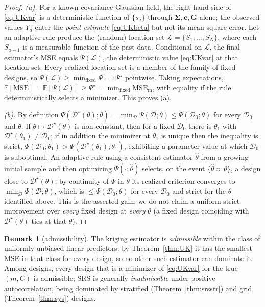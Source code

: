 \documentclass{amsart}
\theoremstyle{definition}
\newtheorem{remark}[theorem]{Remark}
\newcommand{\E}{\mathbb{E}}
\begin{document}
\begin{proof}
\emph{(a).} For a known-covariance Gaussian field, the right-hand side of
\eqref{eq:UKvar} is a deterministic function of $\{s_a\}$ through
$\boldsymbol\Sigma,\mathbf c,\mathbf G$ alone; the observed values $Y_a$
enter the \emph{point estimate} \eqref{eq:UKbeta} but not its
mean-square error. Let an adaptive rule produce the (random) location set
$\mathcal L=\{S_1,\dots,S_N\}$, where each $S_{a+1}$ is a measurable
function of the past data. Conditional on $\mathcal L$, the final
estimator's MSE equals $\Psi(\mathcal L)$, the deterministic value
\eqref{eq:UKvar} at that location set. Every realized location set is a
member of the family of fixed designs, so
$\Psi(\mathcal L)\ge\min_{\text{fixed}}\Psi=:\Psi^\star$ pointwise.
Taking expectations,
$\E[\mathrm{MSE}]=\E[\Psi(\mathcal L)]\ge\Psi^\star
=\min_{\text{fixed}}\mathrm{MSE}_{\mathrm m}$, with equality if the rule
deterministically selects a minimizer. This proves (a).

\emph{(b).} By definition $\Psi(\mathcal D^\star(\theta);\theta)
=\min_{\mathcal D}\Psi(\mathcal D;\theta)\le\Psi(\mathcal D_0;\theta)$ for
every $\mathcal D_0$ and $\theta$. If $\theta\mapsto\mathcal D^\star(\theta)$
is non-constant, then for a fixed $\mathcal D_0$ there is $\theta_1$ with
$\mathcal D^\star(\theta_1)\ne\mathcal D_0$; if in addition the minimizer at
$\theta_1$ is unique then the inequality is strict,
$\Psi(\mathcal D_0;\theta_1)>\Psi(\mathcal D^\star(\theta_1);\theta_1)$,
exhibiting a parameter value at which $\mathcal D_0$ is suboptimal. An
adaptive rule using a consistent estimator $\widehat\theta$ from a growing
initial sample and then optimizing $\Psi(\cdot;\widehat\theta)$ selects, on
the event $\{\widehat\theta\approx\theta\}$, a design close to
$\mathcal D^\star(\theta)$; by continuity of $\Psi$ in $\theta$ its
realized criterion converges to $\min_{\mathcal D}\Psi(\mathcal D;\theta)$,
which is $\le\Psi(\mathcal D_0;\theta)$ for every $\mathcal D_0$ and strict
for the $\theta$ identified above. This is the asserted gain; we do not
claim a uniform strict improvement over \emph{every} fixed design at
\emph{every} $\theta$ (a fixed design coinciding with
$\mathcal D^\star(\theta)$ ties at that $\theta$).
\end{proof}

\begin{remark}[admissibility]
The kriging estimator is \emph{admissible} within the class of uniformly
unbiased linear predictors: by Theorem~\ref{thm:UK} it has the smallest MSE
in that class for every design, so no other such estimator can dominate it.
Among designs, every design that is a minimizer of \eqref{eq:UKvar} for the
true $(m,C)$ is admissible; SRS is generally \emph{inadmissible} under
positive autocorrelation, being dominated by stratified
(Theorem~\ref{thm:srsstr}) and grid (Theorem~\ref{thm:sys}) designs.
\end{remark}
\end{document}
